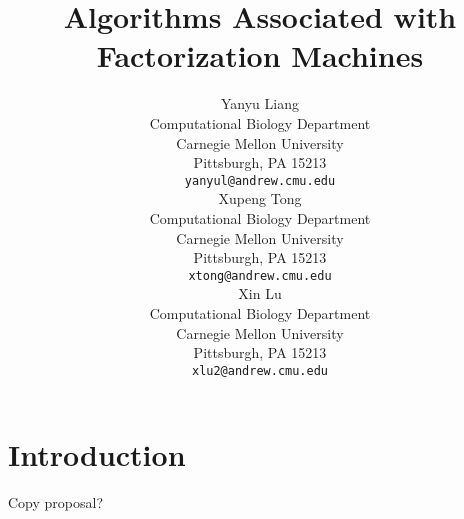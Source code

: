 \documentclass{article}
\title{Algorithms Associated with Factorization Machines}
\author{
  Yanyu Liang \\
  Computational Biology Department\\
  Carnegie Mellon University\\
  Pittsburgh, PA 15213 \\
  \texttt{yanyul@andrew.cmu.edu} \\
  \And
  Xupeng Tong \\
  Computational Biology Department\\
  Carnegie Mellon University\\
  Pittsburgh, PA 15213 \\
  \texttt{xtong@andrew.cmu.edu} \\
  \AND
  Xin Lu \\
  Computational Biology Department\\
  Carnegie Mellon University\\
  Pittsburgh, PA 15213 \\
  \texttt{xlu2@andrew.cmu.edu} \\
}
\begin{document}

\maketitle


\section{Introduction}


Copy proposal?
\end{document}
